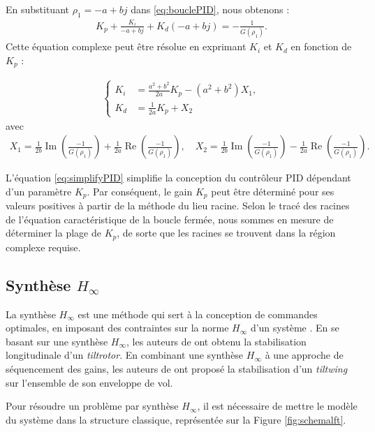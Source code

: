 En substituant  $\rho_{1} = -a + bj$ dans \eqref{eq:bouclePID}, nous obtenons : 
\begin{align}
    K_{p} +  \frac{K_{i}}{-a + bj} + K_{d} (-a + bj) = -\frac{1}{G(\rho_{1})}.
\end{align}
Cette équation complexe peut être résolue en exprimant $K_{i}$ et $K_{d}$ en fonction de $K_{p}$ :

\begin{align}
    \label{eq:simplifyPID}
    \left\{
        \begin{aligned}
            K_{i} &= \frac{a^{2} + b^{2}}{2a} K_{p} - (a^{2} + b^{2}) X_{1},\\
            K_{d} &= \frac{1}{2a} K_{p} + X_{2}
        \end{aligned}
      \right.
  \end{align}
  avec 
  \begin{align*}
    X_{1} = \frac{1}{2b} \operatorname{Im}(\frac{-1}{G(\rho_{1})})+ \frac{1}{2a} \operatorname{Re}(\frac{-1}{G(\rho_{1})}), \quad X_{2} = \frac{1}{2b} \operatorname{Im}(\frac{-1}{G(\rho_{1})})- \frac{1}{2a} \operatorname{Re}(\frac{-1}{G(\rho_{1})}).
  \end{align*}

  L'équation \eqref{eq:simplifyPID} simplifie la conception du contrôleur PID dépendant d'un paramètre $K_{p}$. Par conséquent, le gain $K_{p}$ peut être déterminé pour ses valeurs positives à partir de la méthode du lieu racine. Selon le tracé des racines de l'équation caractéristique de la boucle fermée, nous sommes en mesure de déterminer la plage de $K_{p}$, de sorte que les racines se trouvent dans la région complexe requise. 

\subsection*{Synthèse $H_{\infty}$}
La synthèse $H_{\infty}$ est une méthode qui sert à la conception de commandes optimales, en imposant des contraintes sur la norme $H_{\infty}$ d'un système \cite{1576856, ApkarianMulti}. En se basant sur une synthèse $H_{\infty}$, les auteurs de \cite{SunYang2009} ont obtenu la stabilisation longitudinale d'un \textit{tiltrotor}. En combinant une synthèse $H_{\infty}$ à une approche de séquencement des gains, les auteurs de \cite{DickesonMix2005, DickesonCifdaloz2006,DickesonMiles2007} ont proposé la stabilisation d'un \textit{tiltwing} sur l'ensemble de son enveloppe de vol.

Pour résoudre un problème par synthèse $H_{\infty}$, il est nécessaire de mettre le modèle du système dans la structure classique, représentée sur la Figure \ref{fig:schemalft}. 

